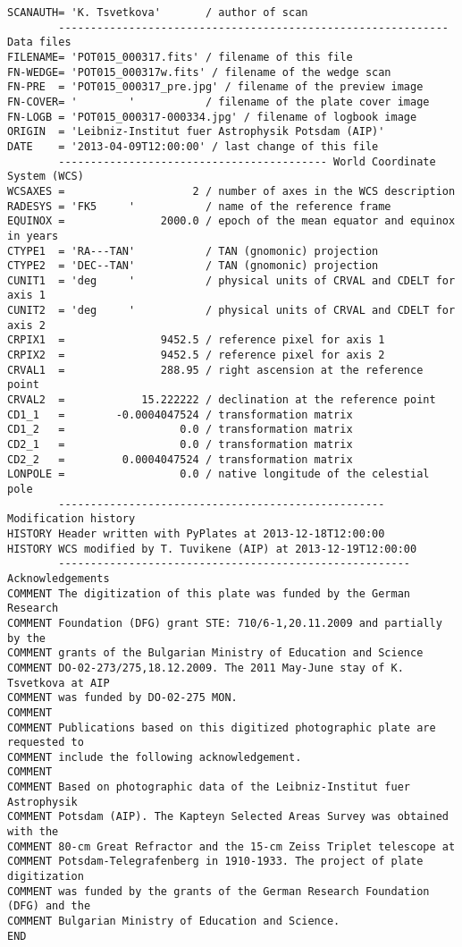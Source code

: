 \documentclass[11pt]{ivoa}
\begin{document}
\begin{lstlisting}
SCANAUTH= 'K. Tsvetkova'       / author of scan
        ------------------------------------------------------------- Data files
FILENAME= 'POT015_000317.fits' / filename of this file
FN-WEDGE= 'POT015_000317w.fits' / filename of the wedge scan
FN-PRE  = 'POT015_000317_pre.jpg' / filename of the preview image
FN-COVER= '        '           / filename of the plate cover image
FN-LOGB = 'POT015_000317-000334.jpg' / filename of logbook image
ORIGIN  = 'Leibniz-Institut fuer Astrophysik Potsdam (AIP)'
DATE    = '2013-04-09T12:00:00' / last change of this file
        ------------------------------------------ World Coordinate System (WCS)
WCSAXES =                    2 / number of axes in the WCS description
RADESYS = 'FK5     '           / name of the reference frame
EQUINOX =               2000.0 / epoch of the mean equator and equinox in years
CTYPE1  = 'RA---TAN'           / TAN (gnomonic) projection
CTYPE2  = 'DEC--TAN'           / TAN (gnomonic) projection
CUNIT1  = 'deg     '           / physical units of CRVAL and CDELT for axis 1
CUNIT2  = 'deg     '           / physical units of CRVAL and CDELT for axis 2
CRPIX1  =               9452.5 / reference pixel for axis 1
CRPIX2  =               9452.5 / reference pixel for axis 2
CRVAL1  =               288.95 / right ascension at the reference point
CRVAL2  =            15.222222 / declination at the reference point
CD1_1   =        -0.0004047524 / transformation matrix
CD1_2   =                  0.0 / transformation matrix
CD2_1   =                  0.0 / transformation matrix
CD2_2   =         0.0004047524 / transformation matrix
LONPOLE =                  0.0 / native longitude of the celestial pole
        --------------------------------------------------- Modification history
HISTORY Header written with PyPlates at 2013-12-18T12:00:00
HISTORY WCS modified by T. Tuvikene (AIP) at 2013-12-19T12:00:00
        ------------------------------------------------------- Acknowledgements
COMMENT The digitization of this plate was funded by the German Research
COMMENT Foundation (DFG) grant STE: 710/6-1,20.11.2009 and partially by the
COMMENT grants of the Bulgarian Ministry of Education and Science
COMMENT DO-02-273/275,18.12.2009. The 2011 May-June stay of K. Tsvetkova at AIP
COMMENT was funded by DO-02-275 MON.
COMMENT
COMMENT Publications based on this digitized photographic plate are requested to
COMMENT include the following acknowledgement.
COMMENT
COMMENT Based on photographic data of the Leibniz-Institut fuer Astrophysik
COMMENT Potsdam (AIP). The Kapteyn Selected Areas Survey was obtained with the
COMMENT 80-cm Great Refractor and the 15-cm Zeiss Triplet telescope at
COMMENT Potsdam-Telegrafenberg in 1910-1933. The project of plate digitization
COMMENT was funded by the grants of the German Research Foundation (DFG) and the
COMMENT Bulgarian Ministry of Education and Science.
END
\end{lstlisting}
\end{document}
